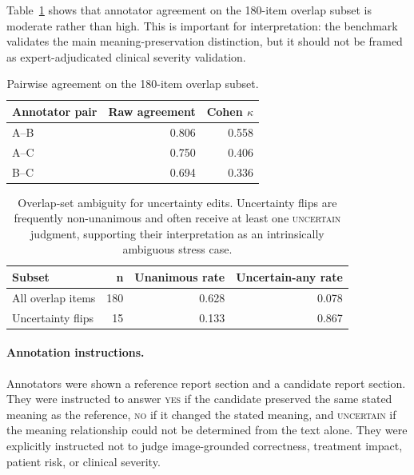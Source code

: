 \documentclass[11pt]{article}
\newcommand{\yes}{\textsc{yes}\xspace}
\newcommand{\no}{\textsc{no}\xspace}
\newcommand{\uncertain}{\textsc{uncertain}\xspace}
\begin{document}
Table~\ref{tab:pairwise-agreement} shows that annotator agreement on the 180-item overlap subset is moderate rather than high. 
This is important for interpretation: the benchmark validates the main meaning-preservation distinction, but it should not be framed as expert-adjudicated clinical severity validation.

\begin{table}[H]
\centering
\scriptsize
\begin{tabular}{lrr}
\toprule
\textbf{Annotator pair} & \textbf{Raw agreement} & \textbf{Cohen $\kappa$} \\
\midrule
A--B & 0.806 & 0.558 \\
A--C & 0.750 & 0.406 \\
B--C & 0.694 & 0.336 \\
\bottomrule
\end{tabular}
\caption{Pairwise agreement on the 180-item overlap subset.}
\label{tab:pairwise-agreement}
\end{table}

\begin{table}[H]
\centering
\scriptsize
\begin{tabular}{lrrr}
\toprule
\textbf{Subset} & \textbf{n} & \textbf{Unanimous rate} & \textbf{Uncertain-any rate} \\
\midrule
All overlap items & 180 & 0.628 & 0.078 \\
Uncertainty flips & 15 & 0.133 & 0.867 \\
\bottomrule
\end{tabular}
\caption{Overlap-set ambiguity for uncertainty edits. Uncertainty flips are frequently non-unanimous and often receive at least one \uncertain judgment, supporting their interpretation as an intrinsically ambiguous stress case.}
\label{tab:uncertainty-overlap}
\end{table}

\paragraph{Annotation instructions.}
Annotators were shown a reference report section and a candidate report section. They were instructed to answer \yes if the candidate preserved the same stated meaning as the reference, \no if it changed the stated meaning, and \uncertain if the meaning relationship could not be determined from the text alone. They were explicitly instructed not to judge image-grounded correctness, treatment impact, patient risk, or clinical severity.
\end{document}
